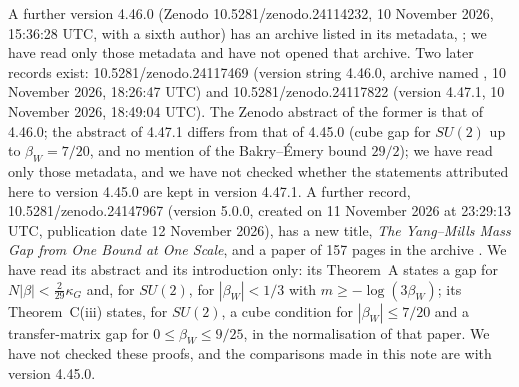 \documentclass[11pt,a4paper]{article}
\theoremstyle{remark}
\theoremstyle{definition}
\theoremstyle{plain}
\theoremstyle{remark}
\begin{document}
A further version 4.46.0 (Zenodo 10.5281/zenodo.24114232, 10 November 2026, 15:36:28 UTC, with a sixth author) has an archive listed in its metadata, ; we have read only those metadata and have not opened that archive. Two later records exist: 10.5281/zenodo.24117469 (version string 4.46.0, archive named , 10 November 2026, 18:26:47 UTC) and 10.5281/zenodo.24117822 (version 4.47.1, 10 November 2026, 18:49:04 UTC). The Zenodo abstract of the former is that of 4.46.0; the abstract of 4.47.1 differs from that of 4.45.0 (cube gap for $SU(2)$ up to $\beta_W=7/20$, and no mention of the Bakry--\'Emery bound $29/2$); we have read only those metadata, and we have not checked whether the statements attributed here to version 4.45.0 are kept in version 4.47.1. A further record, 10.5281/zenodo.24147967 (version 5.0.0, created on 11 November 2026 at 23:29:13 UTC, publication date 12 November 2026), has a new title, \emph{The Yang--Mills Mass Gap from One Bound at One Scale}, and a paper of 157 pages in the archive . We have read its abstract and its introduction only: its Theorem~A states a gap for $N|\beta|<\tfrac{2}{29}\kappa_G$ and, for $SU(2)$, for $|\beta_W|<1/3$ with $m\ge-\log(3\beta_W)$; its Theorem~C(iii) states, for $SU(2)$, a cube condition for $|\beta_W|\le7/20$ and a transfer-matrix gap for $0\le\beta_W\le9/25$, in the normalisation of that paper. We have not checked these proofs, and the comparisons made in this note are with version 4.45.0.
\end{document}
